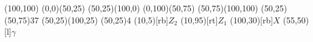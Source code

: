 \begin{axopicture}(100,100)
	\Line[arrow](0,0)(50,25)
	\Line[arrow](50,25)(100,0)
	\Line[arrow](0,100)(50,75) 
	\Line[arrow](50,75)(100,100)
	\Photon(50,25)(50,75){3}{7}
	(50,25)(100,25)
	\Vertex(50,25){4}
	\Text(10,5)[rb]{$Z_2$}
	\Text(10,95)[rt]{$Z_1$}
	\Text(100,30)[rb]{$X$}
	\Text(55,50)[l]{$\gamma$}
\end{axopicture}

